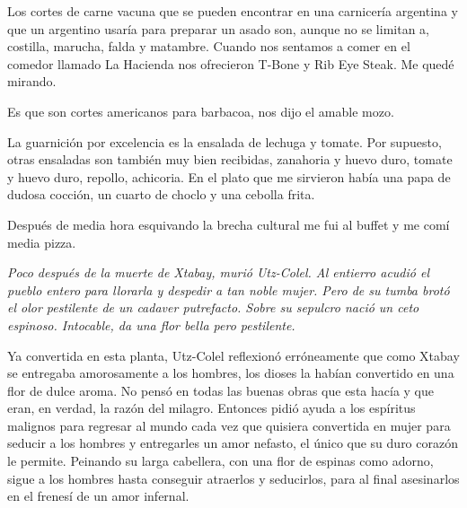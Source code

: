 \documentclass[12pt,twoside,openright,a5paper]{book}
\begin{document}
\vspace{0.5cm}
\hrulefill\hspace{0.2cm} \decofourleft\decofourright \hspace{0.2cm} \hrulefill
\vspace{0.5cm}

Los cortes de carne vacuna que se pueden encontrar en una carnicería
argentina y que un argentino usaría para preparar un asado son, aunque
no se limitan a, costilla, marucha, falda y matambre. Cuando nos sentamos
a comer en el comedor llamado La Hacienda nos ofrecieron T-Bone y Rib Eye
Steak. Me quedé mirando.

Es que son cortes americanos para barbacoa, nos dijo el amable mozo.

La guarnición por excelencia es la ensalada de lechuga y tomate. Por
supuesto, otras ensaladas son también muy bien recibidas, zanahoria y huevo
duro, tomate y huevo duro, repollo, achicoria. En el plato que me sirvieron
había una papa de dudosa cocción, un cuarto de choclo y una cebolla frita.

Después de media hora esquivando la brecha cultural me fui al buffet y me
comí media pizza.


\vspace{0.5cm}
\hrulefill\hspace{0.2cm} \decofourleft\decofourright \hspace{0.2cm} \hrulefill
\vspace{0.5cm}

{\em Poco después de la muerte de Xtabay, murió Utz-Colel. Al entierro
acudió el pueblo entero para llorarla y despedir a tan noble mujer. Pero de su
tumba brotó el olor pestilente de un cadaver putrefacto. Sobre su sepulcro
nació un ceto espinoso. Intocable, da una flor bella pero pestilente.

Ya convertida en esta planta, Utz-Colel reflexionó erróneamente que como
Xtabay se entregaba amorosamente a los hombres, los dioses la habían
convertido en una flor de dulce aroma. No pensó en todas las buenas obras
que esta hacía y que eran, en verdad, la razón del milagro. Entonces pidió
ayuda a los espíritus malignos para  regresar al mundo cada vez que quisiera
convertida en mujer para seducir a los hombres y entregarles un amor nefasto,
el único que su duro corazón le permite. Peinando su larga cabellera, con
una flor de espinas como adorno, sigue a los hombres hasta conseguir atraerlos
y seducirlos, para al final asesinarlos en el frenesí de un amor infernal.}
\end{document}
